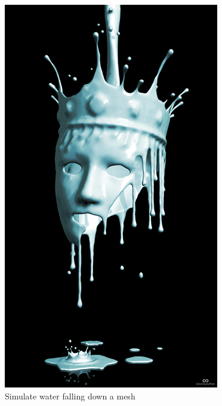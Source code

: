 \documentclass[10pt,conference,compsocconf]{IEEEtran}
\begin{document}
\begin{figure}[tbp]
	\centering
	\includegraphics[width=\columnwidth]{liquid_mesh}
	\caption{Simulate water falling down a mesh}
	\vspace{-3mm}
	\label{fig:water}
\end{figure}
\end{document}
